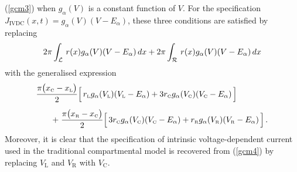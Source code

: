 (\ref{gcm3}) when $g_\alpha(V)$ is a constant function of $V$. For
the specification $J_\mathrm{IVDC}(x,t)=g_\alpha(V)(V-E_\alpha)$,
these three conditions are satisfied by replacing
\[
\displaystyle2\pi\int_\mathcal{L}\, r(x) g_\alpha(V)(V-E_\alpha)\,dx
+2\pi\int_\mathcal{R}\, r(x) g_\alpha(V)(V-E_\alpha)\,dx
\]
with the generalised expression
\begin{equation}\label{gcm4}
\begin{array}{l}
\displaystyle\frac{\pi\big(x_{\mbox{\tiny C}}-x_{\mbox{\tiny L}}\big)}{2}
\Big[\,r_{\mbox{\tiny L}} g_\alpha(V_{\mbox{\tiny L}})(V_{\mbox{\tiny L}}-E_\alpha)
+3r_{\mbox{\tiny C}} g_\alpha(V_{\mbox{\tiny C}})(V_{\mbox{\tiny C}}-E_\alpha)\,\Big]\\[12pt]
\qquad\displaystyle+\;\frac{\pi\big(x_{\mbox{\tiny R}}-x_{\mbox{\tiny C}}\big)}{2}
\Big[\,3r_{\mbox{\tiny C}} g_\alpha(V_{\mbox{\tiny C}})(V_{\mbox{\tiny C}}-E_\alpha)
+r_{\mbox{\tiny R}} g_\alpha(V_{\mbox{\tiny R}})(V_{\mbox{\tiny R}}-E_\alpha)\,\Big]\,.
\end{array}
\end{equation}
Moreover, it is clear that the specification of intrinsic
voltage-dependent current used in the traditional compartmental
model is recovered from (\ref{gcm4}) by replacing $V_\mathrm{L}$
and $V_\mathrm{R}$ with $V_\mathrm{C}$.
